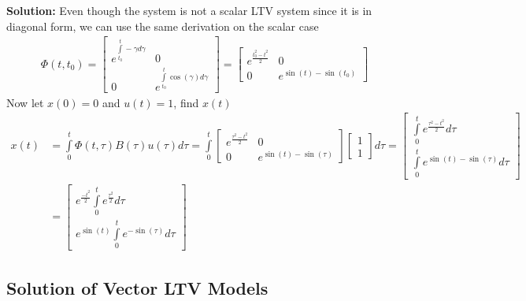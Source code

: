 \documentclass[twoside]{article}
\begin{document}
\textbf{Solution:} Even though the system is not a scalar LTV system since it is in diagonal form, we can use the same derivation on the scalar case
%
\begin{align*}	
	\Phi(t , t_0) = \begin{bmatrix} e^{ \int\limits_{t_0}^{t} -\gamma d\gamma  } & 0 \\ 0 & e^{ \int\limits_{t_0}^{t} \cos(\gamma) d\gamma  } \end{bmatrix} 
	= \begin{bmatrix} e^{ \frac{t_0^2 - t^2}{2} } & 0 \\ 0 & e^{ \sin(t) - \sin(t_0)  } \end{bmatrix} 
\end{align*}	
%
Now let $x(0) = 0$ and $u(t) = 1$, find $x(t)$
%
\begin{align*}
x(t) &= \int\limits_{0}^{t} \Phi(t , \tau) B(\tau) u(\tau) d\tau = \int\limits_{0}^{t} \begin{bmatrix} e^{ \frac{\tau^2 - t^2}{2} } & 0 \\ 0 & e^{ \sin(t) - \sin(\tau)  } \end{bmatrix}  \begin{bmatrix} 1 \\ 1  \end{bmatrix} d\tau
= \begin{bmatrix} \int\limits_{0}^{t} e^{ \frac{\tau^2 - t^2}{2} } d\tau \\ \int\limits_{0}^{t} e^{ \sin(t) - \sin(\tau)  } d\tau \end{bmatrix}   
\\
&= \begin{bmatrix} e^{ \frac{- t^2}{2} } \int\limits_{0}^{t} e^{ \frac{\tau^2}{2} } d\tau \\ e^{ \sin(t) } \int\limits_{0}^{t} e^{ - \sin(\tau)  } d\tau \end{bmatrix}   
\end{align*}

\subsection{Solution of Vector LTV Models}
\end{document}

